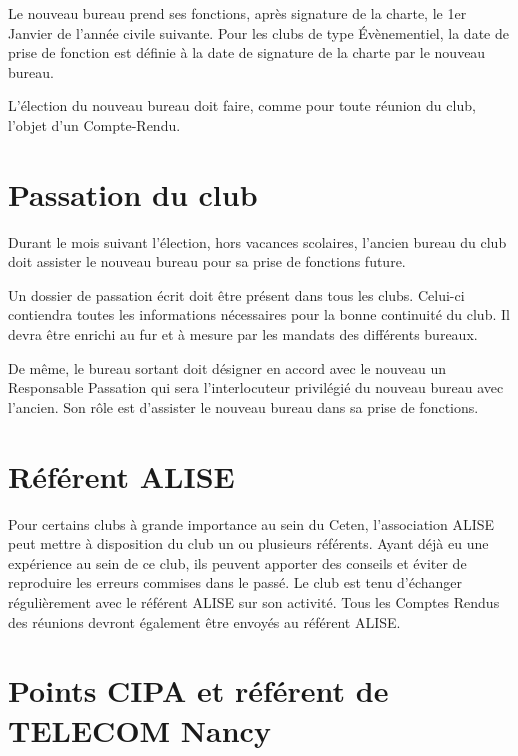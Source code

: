 \documentclass{article} %
\begin{document}
\begin{multicols}{2}
{			Le nouveau bureau prend ses fonctions, après signature de
			la charte, le 1er Janvier de l’année civile suivante. Pour les
			clubs de type Évènementiel, la date de prise de fonction est
			définie à la date de signature de la charte par le nouveau
			bureau.

			L’élection du nouveau bureau doit faire, comme pour toute
			réunion du club, l’objet d’un Compte-Rendu.

		}
		
		\section{Passation du club}

		{\small

			Durant le mois suivant l’élection, hors vacances scolaires,
			l’ancien bureau du club doit assister le nouveau bureau pour
			sa prise de fonctions future.

			Un dossier de passation écrit doit être présent dans tous les
			clubs. Celui-ci contiendra toutes les informations
			nécessaires pour la bonne continuité du club. Il devra être
			enrichi au fur et à mesure par les mandats des différents
			bureaux.

			De même, le bureau sortant doit désigner en accord avec le
			nouveau un Responsable Passation qui sera l’interlocuteur
			privilégié du nouveau bureau avec l’ancien. Son rôle est
			d’assister le nouveau bureau dans sa prise de fonctions.

		}
		
		\section{Référent ALISE}

		{\small

			Pour certains clubs à grande importance au sein du Ceten,
			l’association ALISE peut mettre à disposition du club un ou
			plusieurs référents. Ayant déjà eu une expérience au sein de
			ce club, ils peuvent apporter des conseils et éviter de
			reproduire les erreurs commises dans le passé. Le club est
			tenu d’échanger régulièrement avec le référent ALISE sur
			son activité. Tous les Comptes Rendus des réunions devront
			également être envoyés au référent ALISE.

		}
		
		\section{Points CIPA et référent de TELECOM Nancy}


\end{multicols}
\end{document}
